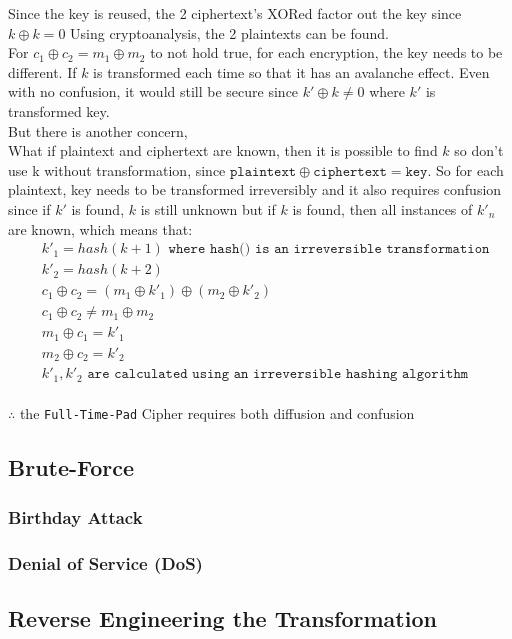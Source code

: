 \documentclass[fleqn, a4paper,12pt]{article}
\begin{document}
Since the key is reused, the 2 ciphertext's XORed factor out the key since $k \oplus k = 0$
Using cryptoanalysis, the 2 plaintexts can be found. 
\\
For $c_1 \oplus c_2 = m_1 \oplus m_2$ to not hold true, for each encryption, the key needs to be different. If $k$ is transformed each time so that it has an avalanche effect. Even with no confusion, it would still be secure since $k' \oplus k \neq  0$ where $k'$ is transformed key. 
\\
But there is another concern,
\\
What if plaintext and ciphertext are known, then it is possible to find $k$ so don't use k without transformation, since $\texttt{plaintext} \oplus \texttt{ciphertext} = \texttt{key}$. So for each plaintext, key needs to be transformed irreversibly and it also requires confusion since if $k'$ is found, $k$ is still unknown but if $k$ is found, then all instances of $k'_n$ are known, which means that: 
\[
\begin{aligned}
&k'_1 = hash(k+1) \texttt{ where hash() is an irreversible transformation} \\
&k'_2 = hash(k+2) \\
&c_1 \oplus c_2 = (m_1 \oplus k'_1) \oplus (m_2 \oplus k'_2) \\
&c_1 \oplus c_2 \neq m_1 \oplus m_2 \\
&m_1 \oplus c_1 = k'_1 \\
&m_2 \oplus c_2 = k'_2 \\
&k'_1, k'_2 \texttt{  are calculated using an irreversible hashing algorithm }
\end{aligned}
\]
\\


$\therefore$ the \texttt{Full-Time-Pad} Cipher requires both diffusion and confusion

\subsection{Brute-Force}


\subsubsection {Birthday Attack}

\subsubsection {Denial of Service (DoS)}

\subsection{Reverse Engineering the Transformation}
\end{document}
